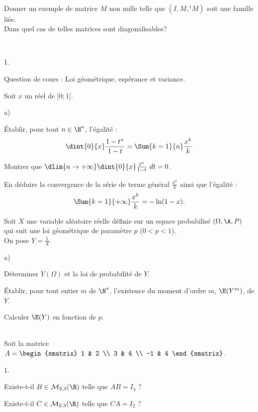 \documentclass[11pt]{article}%
\begin{document}
\begin{exerciceSP}~\\
  Donner un exemple de matrice $M$ non nulle telle que $(I , M , {}^t
  M)$ soit une famille liée. \\
  Dans quel cas de telles matrices sont diagonalisables?
\end{exerciceSP}


\begin{exerciceAP}~
  \begin{noliste}{1.}
    \setlength{\itemsep}{2mm}
  \item Question de cours : Loi géométrique, espérance et variance.
  \item Soit $x$ un réel de $]0 ; 1[$.
    \begin{noliste}{a)}
    \setlength{\itemsep}{2mm} 
    \item Établir, pour tout $n \in \N^*$, l'égalité :
      \[
      \dint{0}{x} \frac{1-t^n}{1-t} = \Sum{k=1}{n} \frac{x^k}{k}
      \]
    \item Montrer que $\dlim{n \rightarrow +\infty} \dint{0}{x}
      \frac{t^n}{1-t}\ dt = 0$.
    \item En déduire la convergence de la série de terme général
      $\frac{x^k}{k}$ ainsi que l'égalité :
      \[
      \Sum{k=1}{+\infty} \frac{x^k}{k} = - \ln (1-x).
      \]
    \end{noliste}
  \item Soit $X$ une variable aléatoire réelle définie sur un espace
    probabilisé $(\Omega , \A , P)$ qui suit une loi
    géométrique de paramètre $p$ ($0<p<1$). \\
    On pose $Y = \frac{1}{X}$.
    \begin{noliste}{a)}
    \setlength{\itemsep}{2mm}
    \item Déterminer $Y(\Omega)$ et la loi de probabilité de $Y$.
    \item Établir, pour tout entier $m$ de $\N^*$, l'existence du
      moment d'ordre $m$, $\E(Y^m)$, de $Y$.
    \item Calculer $\E(Y)$ en fonction de $p$.
    \end{noliste}
  \end{noliste}
\end{exerciceAP}


\begin{exerciceSP}~\\
  Soit la matrice $A = 
  \begin{smatrix} 
    1 & 2 \\ 
    3 & 4 \\ 
    -1 & 4
  \end{smatrix}$.
  \begin{noliste}{1.}
    \setlength{\itemsep}{2mm}
  \item Existe-t-il $B \in \mathcal{M}_{2,3} (\R)$ telle que $AB =
    I_3$ ?
  \item Existe-t-il $C \in \mathcal{M}_{2,3} (\R)$ telle que $CA =
    I_2$ ?
  \end{noliste}
\end{exerciceSP}
\end{document}
